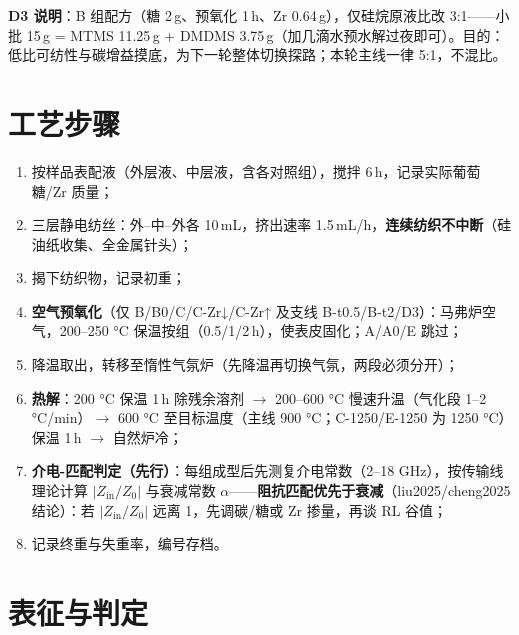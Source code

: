 \textbf{D3 说明}：B 组配方（糖 2\,g、预氧化 1\,h、Zr 0.64\,g），仅硅烷原液比改 3:1——小批 15\,g = MTMS 11.25\,g + DMDMS 3.75\,g（加几滴水预水解过夜即可）。目的：低比可纺性与碳增益摸底，为下一轮整体切换探路；本轮主线一律 5:1，不混比。

\section{工艺步骤}

\begin{enumerate}
  \item 按样品表配液（外层液、中层液，含各对照组），搅拌 6\,h，记录实际葡萄糖/Zr 质量；
  \item 三层静电纺丝：外–中–外各 10\,mL，挤出速率 1.5\,mL/h，\textbf{连续纺织不中断}（硅油纸收集、全金属针头）；
  \item 揭下纺织物，记录初重；
  \item \textbf{空气预氧化}（仅 B/B0/C/C-Zr↓/C-Zr↑ 及支线 B-t0.5/B-t2/D3）：马弗炉空气，200–250 °C 保温按组（0.5/1/2\,h），使表皮固化；A/A0/E 跳过；
  \item 降温取出，转移至惰性气氛炉（先降温再切换气氛，两段必须分开）；
  \item \textbf{ 热解}：200 °C 保温 1\,h 除残余溶剂 $\rightarrow$ 200–600 °C 慢速升温（气化段 1–2 °C/min）$\rightarrow$ 600 °C 至目标温度（主线 900 °C；C-1250/E-1250 为 1250 °C）保温 1\,h $\rightarrow$ 自然炉冷；
  \item \textbf{介电-匹配判定（先行）}：每组成型后先测复介电常数（2–18 GHz），按传输线理论计算 $|Z_{\mathrm{in}}/Z_0|$ 与衰减常数 $\alpha$——\textbf{阻抗匹配优先于衰减}（liu2025/cheng2025 结论）：若 $|Z_{\mathrm{in}}/Z_0|$ 远离 1，先调碳/糖或 Zr 掺量，再谈 RL 谷值；
  \item 记录终重与失重率，编号存档。
\end{enumerate}

\section{表征与判定}

